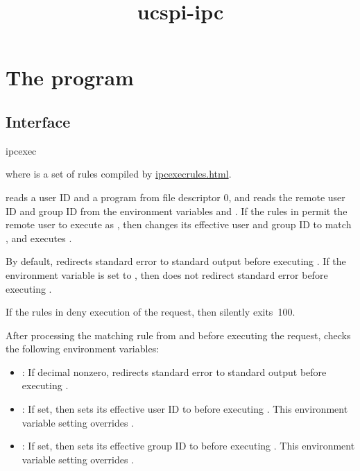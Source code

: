 \documentclass{book}
\title{ucspi-ipc}
\begin{document}
\section{The  program}

\subsection{Interface}
\begin{code}%
  ipcexec 
\end{code}
where  is a set of rules compiled by
\href{\cmd{ipcexecrules}}{ipcexecrules.html}.

 reads a user ID  and a program  from file
descriptor 0, and reads the remote user ID and group ID from the environment
variables  and .  If the rules in
 permit the remote user to execute  as , then
 changes its effective user and group ID to match ,
and executes .

By default,  redirects standard error to standard output before
executing .  If the  environment variable is set to
, then  does not redirect standard error before executing
.

If the rules in  deny execution of the request, then 
silently exits~100.


After processing the matching rule from  and before executing the
request,  checks the following environment variables:
\begin{itemize}
\item {}:
If decimal nonzero,  redirects standard error to standard output
before executing .

\item {}:
If set, then  sets its effective user ID to  before
executing .  This environment variable setting overrides .

\item {}:
If set, then  sets its effective group ID to  before
executing .  This environment variable setting overrides .
\end{itemize}
\end{document}
